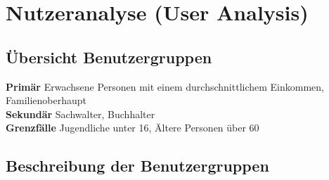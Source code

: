 \documentclass[runningheads,a4paper]{llncs}
\begin{document}
\begin{figure}
\centering
{}
\end{figure}
\clearpage

\section{Nutzeranalyse (User Analysis)}
\subsection{Übersicht Benutzergruppen}


\textbf{Primär} Erwachsene Personen mit einem durchschnittlichem Einkommen, \\ Familienoberhaupt\\
\textbf{Sekundär} Sachwalter, Buchhalter\\
\textbf{Grenzfälle} Jugendliche unter 16, Ältere Personen über 60\\

\subsection{Beschreibung der Benutzergruppen}
\end{document}
